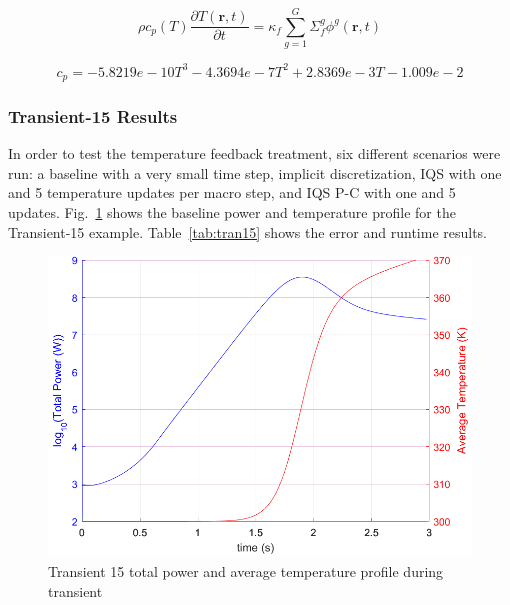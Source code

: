 \documentclass{anstrans}
\renewcommand{\vec}[1]{\bm{#1}} %
\newcommand{\fig}[1]{Fig.~\ref{#1}}                      %
\newcommand{\tbl}[1]{Table~\ref{#1}}                     %
\newcommand{\be}{\begin{equation}}
\newcommand{\ee}{\end{equation}}
\begin{document}
\be
\rho c_p(T) \frac{\partial T(\vec{r},t)}{\partial t} = \kappa_f \sum^G_{g=1}\Sigma_f^g \phi^g(\vec{r},t)
\label{eq:temp2}
\ee

\be
c_p = -5.8219e-10T^3 - 4.3694e-7T^2 + 2.8369e-3T -1.009e-2
\label{eq:cp}
\ee

\subsubsection{Transient-15 Results}

In order to test the temperature feedback treatment, six different scenarios were run: a baseline with a very small time step, implicit discretization, IQS with one and 5 temperature updates per macro step, and IQS P-C with one and 5 updates.  \fig{fig:Tran15_profile} shows the baseline power and temperature profile for the Transient-15 example.  \tbl{tab:tran15} shows the error and runtime results.

\begin{figure}[htbp!]
\centering
\includegraphics[width=\linewidth]{Tran15_profile.png}
\caption{Transient 15 total power and average temperature profile during transient}
\label{fig:Tran15_profile}
\end{figure}
\end{document}
